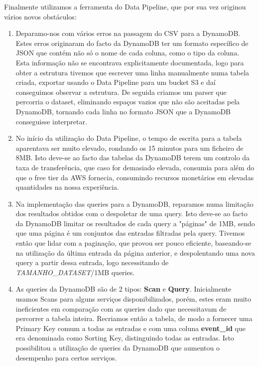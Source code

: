\documentclass[11pt,a4paper]{article}
\begin{document}
Finalmente utilizamos a ferramenta do Data Pipeline, que por sua vez originou vários novos obstáculos:
\begin{enumerate}
	\item Deparamo-nos com vários erros na passagem do CSV para a DynamoDB. Estes erros originaram do facto da DynamoDB ter um formato específico de JSON que contém não só o nome de cada coluna, como o tipo da coluna. Esta informação não se encontrava explicitamente documentada, logo para obter a estrutura tivemos que escrever uma linha manualmente numa tabela criada, exportar usando o Data Pipeline para um bucket S3 e daí conseguimos observar a estrutura. De seguida criamos um parser que percorria o dataset, eliminando espaços vazios que não são aceitadas pela DynamoDB, tornando cada linha no formato JSON que a DynamoDB conseguisse interpretar.
	
	\item No início da utilização do Data Pipeline, o tempo de escrita para a tabela aparentava ser muito elevado, rondando os 15 minutos para um ficheiro de 8MB. Isto deve-se ao facto das tabelas da DynamoDB terem um controlo da taxa de transferência, que caso for demasiado elevada, consumia para além do que o free tier da AWS fornecia, consumindo recursos monetários em elevadas quantidades na nossa experiência.
	
	\item Na implementação das queries para a DynamoDB, reparamos numa limitação dos resultados obtidos com o despoletar de uma query. Isto deve-se ao facto da DynamoDB limitar os resultados de cada query a "páginas" de 1MB, sendo que uma página é um conjuntos das entradas filtradas pela query. Tivemos então que lidar com a paginação, que provou ser pouco eficiente, baseando-se na utilização da última entrada da página anterior, e despolentando uma nova query a partir dessa entrada, logo necessitando de \textit{TAMANHO\_DATASET}/1MB queries.
	
	\item As queries da DynamoDB são de 2 tipos: \textbf{Scan} e \textbf{Query}. Inicialmente usamos Scans para alguns serviços disponibilizados, porém, estes eram muito ineficientes em comparação com as queries dado que necessitavam de percorrer a tabela inteira. Recriamos então a tabela, de modo a fornecer uma Primary Key comum a todas as entradas e com uma coluna \textbf{event\_id} que era denominada como Sorting Key, distinguindo todas as entradas. Isto possibilitou a utilização de queries da DynamoDB que aumentou o desempenho para certos serviços. 
	

\end{enumerate}
\end{document}

